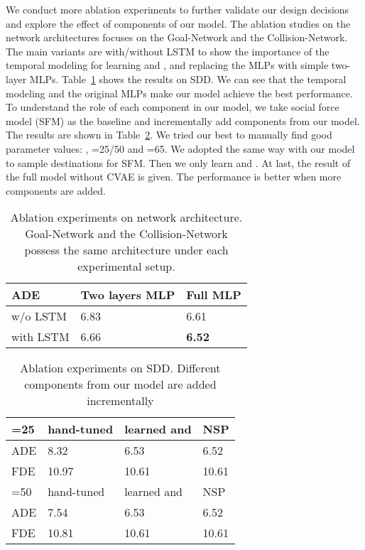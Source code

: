 \documentclass[runningheads]{llncs}
\newcommand{\Tabref}[1]{Table~\ref{tab:#1}}
\begin{document}
\noindent
We conduct more ablation experiments to further validate our design decisions and explore the effect of components of our model. The ablation studies on the network architectures focuses on the Goal-Network and the Collision-Network. The main variants are with/without LSTM to show the importance of the temporal modeling for learning  and , and replacing the MLPs with simple two-layer MLPs. \Tabref{ae1_supp} shows the results on SDD. We can see that the temporal modeling and the original MLPs make our model achieve the best performance.
To understand the role of each component in our model, we take social force model (SFM) as the baseline and incrementally add components from our model. The results are shown in \Tabref{ae2_supp}. We tried our best to manually find good parameter values: , =25/50 and =65. We adopted the same way with our model to sample destinations for SFM. Then we only learn  and . At last, the result of the full model without CVAE is given. The performance is better when more components are added.

\begin{table}[t]
\begin{small}
\begin{center}
\caption{Ablation experiments on network architecture. Goal-Network and the Collision-Network possess the same architecture under each experimental setup.}
\label{tab:ae1_supp}
\begin{tabular}{ |p{1.8cm}||p{2.4cm}|p{1.8cm}|}
\hline
ADE & Two layers MLP & Full MLP \\
\hline
w/o LSTM & 6.83 & 6.61 \\ 
\hline
with LSTM & 6.66 & \textbf{6.52}\\
\hline
\end{tabular}
\end{center}
\end{small}
\end{table}

\begin{table}
\begin{small}
\begin{center}
\caption{Ablation experiments on SDD. Different components from our model are added incrementally}
\label{tab:ae2_supp}
\begin{tabular}{ |p{1.2cm}||p{2.0cm}|p{2.7cm}|p{1.1cm}|}
\hline
=25 & hand-tuned & learned  and  & NSP\\
\hline
ADE & 8.32 & 6.53 & 6.52 \\ 
\hline
FDE & 10.97 & 10.61 & 10.61\\
\hline
\hline
=50 & hand-tuned & learned  and  & NSP\\
\hline
ADE & 7.54 & 6.53 & 6.52 \\ 
\hline
FDE & 10.81 & 10.61 & 10.61\\
\hline
\end{tabular}
\end{center}
\end{small}
\end{table}
\end{document}
